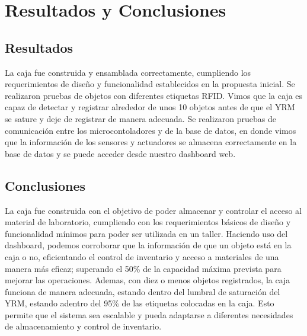 \section{Resultados y Conclusiones}

\subsection{Resultados}
La caja fue construida y ensamblada correctamente, cumpliendo los requerimientos de diseño y funcionalidad establecidos en la propuesta inicial. Se realizaron pruebas de objetos con diferentes etiquetas RFID. Vimos que la caja es capaz de detectar y registrar alrededor de unos 10 objetos antes de que el YRM se sature y deje de registrar de manera adecuada. Se realizaron pruebas de comunicación entre los microcontoladores y de la base de datos, en donde vimos que la información de los sensores y actuadores se almacena correctamente en la base de datos y se puede acceder desde nuestro dashboard web.

\subsection{Conclusiones}
La caja fue construida con el objetivo de poder almacenar y controlar el acceso al material de laboratorio, cumpliendo con los requerimientos básicos de diseño y funcionalidad mínimos para poder ser utilizada en un taller. Haciendo uso del dashboard, podemos corroborar que la información de que un objeto está en la caja o no, eficientando el control de inventario y acceso a materiales de una manera más eficaz; superando el 50\% de la capacidad máxima prevista para mejorar las operaciones. Ademas, con diez o menos objetos registrados, la caja funciona de manera adecuada, estando dentro del lumbral de saturación del YRM, estando adentro del 95\% de las etiquetas colocadas en la caja. Esto permite que el sistema sea escalable y pueda adaptarse a diferentes necesidades de almacenamiento y control de inventario.

